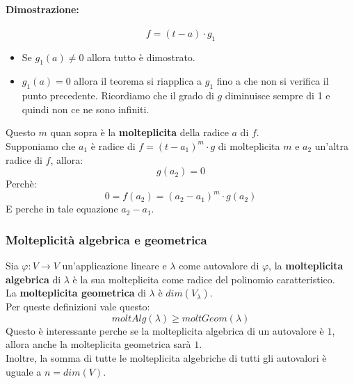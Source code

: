 \documentclass[12pt,a4paper]{article}
\begin{document}
\paragraph{Dimostrazione:}
\[
f = (t - a) \cdot g_1
\]
\begin{itemize}
  \item Se $g_1(a) \ne 0$ allora tutto è dimostrato.
  \item $g_1(a) = 0$ allora il teorema si riapplica a $g_1$ fino a che non si verifica il punto precedente. Ricordiamo che il grado di $g$ diminuisce sempre di 1 e quindi non ce ne sono infiniti.
\end{itemize}
Questo $m$ quan sopra è la \textbf{molteplicita} della radice $a$ di $f$.\\
Supponiamo che $a_1$ è radice di $f = (t - a_1)^m \cdot g$ di molteplicita $m$ e $a_2$ un'altra radice di $f$, allora:
\[
g(a_2) = 0
\]
Perchè:
\[
0 = f(a_2) = (a_2 - a_1)^m \cdot g(a_2)
\]
E perche in tale equazione $a_2 - a_1$.\\
\subsubsection{Molteplicità algebrica e geometrica}
Sia $\varphi: V \to V$ un'applicazione lineare e $\lambda$ come autovalore di $\varphi$, la \textbf{molteplicita algebrica} di $\lambda$ è la sua molteplicita come radice del polinomio caratteristico.\\
La \textbf{molteplicita geometrica} di $\lambda$ è $dim(V_{\lambda})$.\\
Per queste definizioni vale questo:
\[
moltAlg(\lambda) \geq moltGeom(\lambda)
\]
Questo è interessante perche se la molteplicita algebrica di un autovalore è $1$, allora anche la molteplicita geometrica sarà $1$.\\
Inoltre, la somma di tutte le molteplicita algebriche di tutti gli autovalori è uguale a $n = dim(V)$.
\end{document}
